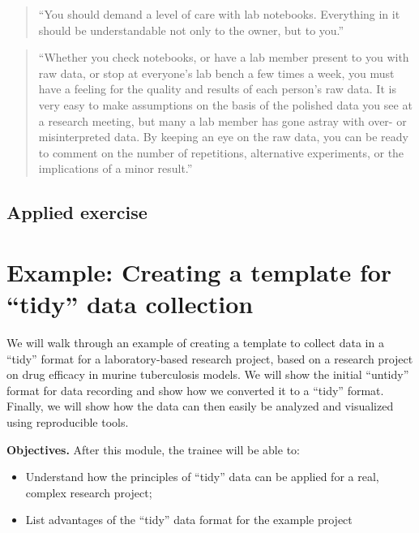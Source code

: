 \documentclass[]{tufte-book}
\providecommand{\tightlist}{%
  \setlength{\itemsep}{0pt}\setlength{\parskip}{0pt}}
\begin{document}
\begin{quote}
``You should demand a level of care with lab notebooks. Everything in it should
be understandable not only to the owner, but to you.'' \citep{leips2010helm}
\end{quote}

\begin{quote}
``Whether you check notebooks, or have a lab member present to you with
raw data, or stop at everyone's lab bench a few times a week, you must
have a feeling for the quality and results of each person's raw data. It is
very easy to make assumptions on the basis of the polished data you
see at a research meeting, but many a lab member has gone astray with over-
or misinterpreted data. By keeping an eye on the raw data, you can be
ready to comment on the number of repetitions, alternative experiments,
or the implications of a minor result.'' \citep{leips2010helm}
\end{quote}

\hypertarget{applied-exercise-1}{%
\subsection{Applied exercise}\label{applied-exercise-1}}

\hypertarget{example-creating-a-template-for-tidy-data-collection}{%
\section{Example: Creating a template for ``tidy'' data collection}\label{example-creating-a-template-for-tidy-data-collection}}

We will walk through an example of creating a template to collect data in a
``tidy'' format for a laboratory-based research project, based on a research
project on drug efficacy in murine tuberculosis models. We will show the initial
``untidy'' format for data recording and show how we converted it to a ``tidy''
format. Finally, we will show how the data can then easily be analyzed and
visualized using reproducible tools.

\textbf{Objectives.} After this module, the trainee will be able to:

\begin{itemize}
\tightlist
\item
  Understand how the principles of ``tidy'' data can be applied for a real, complex research project;
\item
  List advantages of the ``tidy'' data format for the example project
\end{itemize}
\end{document}
